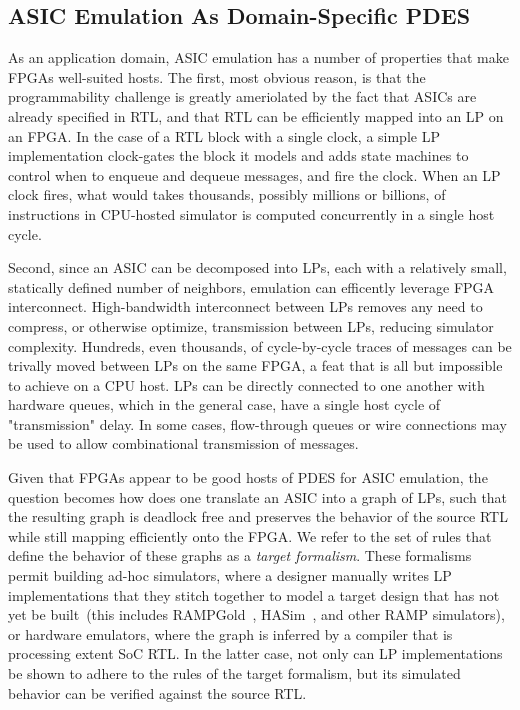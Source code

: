 \subsection{ASIC Emulation As Domain-Specific PDES}

As an application domain, ASIC emulation has a number of properties that make
FPGAs well-suited hosts. The first, most obvious reason, is that the programmability challenge is
greatly ameriolated by the fact that ASICs are already specified in RTL, and
that RTL can be efficiently mapped into an LP on an FPGA. In the case of a RTL block with a single clock, a
simple LP implementation clock-gates the block it models and adds state
machines to control when to enqueue and dequeue messages, and fire the clock.
When an LP clock fires, what would takes thousands, possibly
millions or billions, of instructions in CPU-hosted simulator is computed
concurrently in a single host cycle.

Second, since an ASIC can be decomposed into LPs, each with a relatively small,
statically defined number of neighbors, emulation can efficently leverage FPGA
interconnect. High-bandwidth interconnect between LPs removes any need to compress, or
otherwise optimize, transmission between LPs, reducing simulator complexity.
Hundreds, even thousands, of cycle-by-cycle traces of messages can be trivally
moved between LPs on the same FPGA, a feat that is all but impossible to
achieve on a CPU host. LPs can be directly connected to one another with
hardware queues, which in the general case, have a single host cycle of
"transmission" delay. In some cases, flow-through queues or wire connections
may be used to allow combinational transmission of messages.

Given that FPGAs appear to be good hosts of PDES for ASIC emulation,
the question becomes how does one translate an ASIC into a graph of
LPs, such that the resulting graph is deadlock free and preserves the behavior of the source RTL while still mapping
efficiently onto the FPGA. We refer to the set of rules that define the
behavior of these graphs as a \emph{target formalism}.
These formalisms permit building ad-hoc simulators, where a designer manually
writes LP implementations that they stitch together to model a target design
that has not yet be built~(this includes RAMPGold~\cite{RAMPGold},
HASim~\cite{HASim}, and other RAMP simulators), or hardware emulators, where
the graph is inferred by a compiler that is processing extent SoC RTL. In
the latter case, not only can LP implementations be shown to adhere to the
rules of the target formalism, but its simulated behavior can be verified
against the source RTL.

